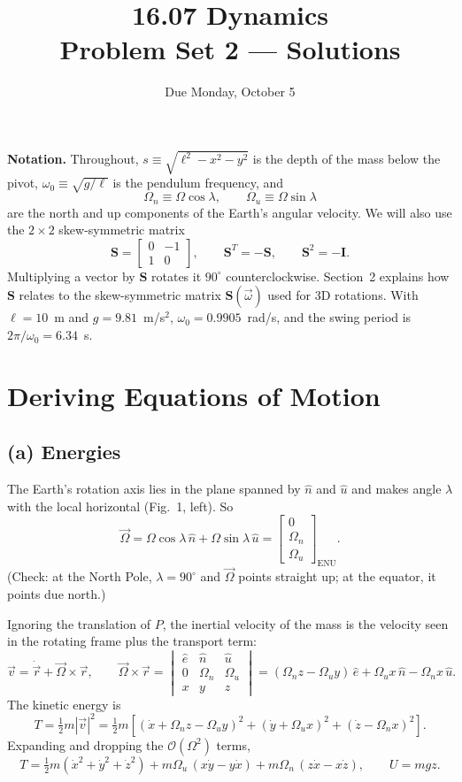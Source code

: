 \documentclass[11pt,letterpaper]{article}
\title{16.07 Dynamics\\Problem Set 2 --- Solutions}
\author{Due Monday, October 5}
\date{}
\newcommand{\bS}{\mathbf{S}}
\newcommand{\bI}{\mathbf{I}}
\newcommand{\ehat}{\hat{e}}
\newcommand{\nhat}{\hat{n}}
\newcommand{\uhat}{\hat{u}}
\newcommand{\Ou}{\Omega_u}
\newcommand{\On}{\Omega_n}
\begin{document}
\maketitle

\noindent\textbf{Notation.} Throughout, $s \equiv \sqrt{\ell^2 - x^2 - y^2}$ is the depth of the mass below the pivot, $\omega_0 \equiv \sqrt{g/\ell}$ is the pendulum frequency, and
\[
\On \equiv \Omega\cos\lambda, \qquad \Ou \equiv \Omega\sin\lambda
\]
are the north and up components of the Earth's angular velocity. We will also use the $2\times2$ skew-symmetric matrix
\[
\bS = \begin{bmatrix} 0 & -1 \\ 1 & 0 \end{bmatrix},
\qquad \bS^T = -\bS, \qquad \bS^2 = -\bI .
\]
Multiplying a vector by $\bS$ rotates it $90^\circ$ counterclockwise. Section~2 explains how $\bS$ relates to the skew-symmetric matrix $\mathbf{S}(\vec\omega)$ used for 3D rotations.
With $\ell = 10$~m and $g = 9.81$~m/s$^2$, $\omega_0 = 0.9905$~rad/s, and the swing period is $2\pi/\omega_0 = 6.34$~s.

\section{Deriving Equations of Motion}

\subsection*{(a) Energies}

The Earth's rotation axis lies in the plane spanned by $\nhat$ and $\uhat$ and makes angle $\lambda$ with the local horizontal (Fig.~1, left). So
\[
\vec\Omega = \Omega\cos\lambda\,\nhat + \Omega\sin\lambda\,\uhat
= \begin{bmatrix} 0 \\ \On \\ \Ou \end{bmatrix}_{\text{ENU}}.
\]
(Check: at the North Pole, $\lambda = 90^\circ$ and $\vec\Omega$ points straight up; at the equator, it points due north.)

Ignoring the translation of $P$, the inertial velocity of the mass is the velocity seen in the rotating frame plus the transport term:
\[
\vec v = \dot{\vec r} + \vec\Omega\times\vec r,
\qquad
\vec\Omega\times\vec r =
\begin{vmatrix} \ehat & \nhat & \uhat \\ 0 & \On & \Ou \\ x & y & z \end{vmatrix}
= (\On z - \Ou y)\,\ehat + \Ou x\,\nhat - \On x\,\uhat .
\]
The kinetic energy is
\[
T = \tfrac12 m|\vec v|^2 = \tfrac12 m\left[(\dot x + \On z - \Ou y)^2 + (\dot y + \Ou x)^2 + (\dot z - \On x)^2\right].
\]
Expanding and dropping the $\mathcal{O}(\Omega^2)$ terms,
\[
\boxed{T = \tfrac12 m\left(\dot x^2 + \dot y^2 + \dot z^2\right)
+ m\Ou\,(x\dot y - y\dot x) + m\On\,(z\dot x - x\dot z),
\qquad
U = m g z .}
\]
\end{document}
